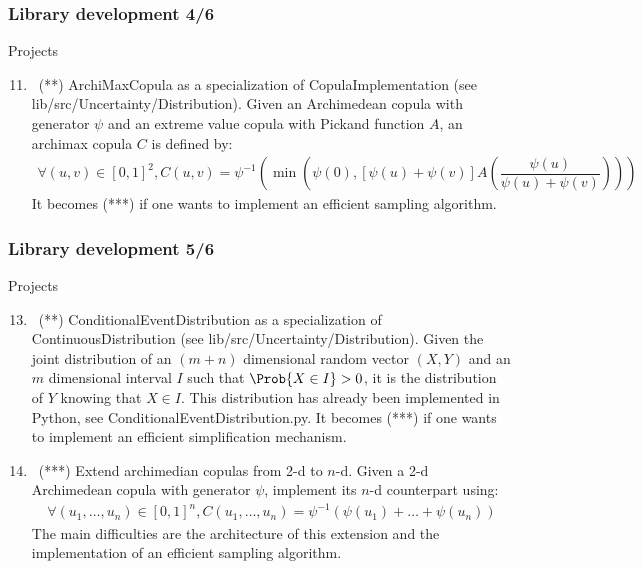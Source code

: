 \documentclass[8pt]{beamer}
\begin{document}
\begin{frame}
  \frametitle{Library development 4/6}
  \begin{block}{Projects}
    \begin{enumerate}
      \setcounter{enumi}{10}
    \item~(**) \alert{\ttfamily ArchiMaxCopula} as a specialization of {\ttfamily CopulaImplementation} (see {\ttfamily lib/src/Uncertainty/Distribution}). Given an Archimedean copula with generator $\psi$ and an extreme value copula with Pickand function $A$, an archimax copula $C$ is defined by:
      \begin{align}
        \forall (u,v)\in[0,1]^2, C(u,v)=\psi^{-1}\left(\min\left(\psi(0), [\psi(u)+\psi(v)]A\left(\dfrac{\psi(u)}{\psi(u)+\psi(v)}\right)\right)\right)
      \end{align}
      It becomes (***) if one wants to implement an efficient sampling algorithm.
    \end{enumerate}
  \end{block}
\end{frame}

\begin{frame}
  \frametitle{Library development 5/6}
  \begin{block}{Projects}
    \begin{enumerate}
      \setcounter{enumi}{12}
    \item~(**) \alert{\ttfamily ConditionalEventDistribution} as a specialization of {\ttfamily ContinuousDistribution} (see {\ttfamily lib/src/Uncertainty/Distribution}). Given the joint distribution of an $(m+n)$ dimensional random vector $(X,Y)$ and an $m$ dimensional interval $I$ such that $\Prob{X\in I}>0$, it is the distribution of $Y$ knowing that $X\in I$. This distribution has already been implemented in Python, see {\ttfamily ConditionalEventDistribution.py}. It becomes (***) if one wants to implement an efficient simplification mechanism.
    \item~(***) Extend archimedian copulas from 2-d to $n$-d. Given a 2-d Archimedean copula with generator $\psi$, implement its $n$-d counterpart using:
      \begin{align}
        \forall (u_1,\dots,u_n)\in[0,1]^n, C(u_1,\dots,u_n)=\psi^{-1}\left(\psi(u_1)+\dots+\psi(u_n)\right)
      \end{align}
      The main difficulties are the architecture of this extension and the implementation of an efficient sampling algorithm.
    \end{enumerate}
  \end{block}
\end{frame}
\end{document}
